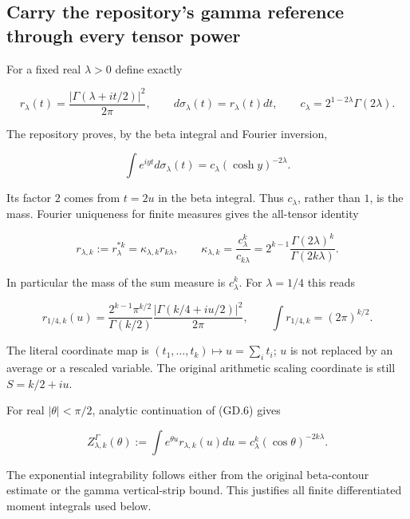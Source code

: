 \subsection[\hspace{0.4em}Carry the repository's gamma reference through every tensor
power]{Carry the repository's gamma reference through every tensor
power}\label{gammad-carry-the-repositorys-gamma-reference-through-every-tensor-power}

For a fixed real \(\lambda>0\) define exactly

\[
r_\lambda(t)=\frac{|\Gamma(\lambda+it/2)|^2}{2\pi},\qquad
 d\sigma_\lambda(t)=r_\lambda(t)dt,\qquad
 c_\lambda=2^{1-2\lambda}\Gamma(2\lambda).                           \tag{GD.5}
\]

The repository proves, by the beta integral and Fourier inversion,

\[
\int e^{iyt}d\sigma_\lambda(t)=c_\lambda(\cosh y)^{-2\lambda}.
                                                                    \tag{GD.6}
\]

Its factor \(2\) comes from \(t=2u\) in the beta integral. Thus
\(c_\lambda\), rather than \(1\), is the mass. Fourier uniqueness for
finite measures gives the all-tensor identity

\[
\boxed{
 r_{\lambda,k}:=r_\lambda^{*k}
 =\kappa_{\lambda,k}r_{k\lambda},\qquad
 \kappa_{\lambda,k}=\frac{c_\lambda^k}{c_{k\lambda}}
 =2^{k-1}\frac{\Gamma(2\lambda)^k}{\Gamma(2k\lambda)}.
}                                                                   \tag{GD.7}
\]

In particular the mass of the sum measure is \(c_\lambda^k\). For
\(\lambda=1/4\) this reads

\[
\boxed{
 r_{1/4,k}(u)=
 \frac{2^{k-1}\pi^{k/2}}{\Gamma(k/2)}
 \frac{|\Gamma(k/4+iu/2)|^2}{2\pi},\qquad
 \int r_{1/4,k}=(2\pi)^{k/2}.
}                                                                   \tag{GD.8}
\]

The literal coordinate map is \((t_1,\ldots,t_k)\mapsto u=\sum_i t_i\);
\(u\) is not replaced by an average or a rescaled variable. The original
arithmetic scaling coordinate is still \(S=k/2+iu\).

For real \(|\theta|<\pi/2\), analytic continuation of (GD.6) gives

\[
Z_{\lambda,k}^{\Gamma}(\theta)
 :=\int e^{\theta u}r_{\lambda,k}(u)du
 =c_\lambda^k(\cos\theta)^{-2k\lambda}.                            \tag{GD.9}
\]

The exponential integrability follows either from the original
beta-contour estimate or the gamma vertical-strip bound. This justifies
all finite differentiated moment integrals used below.


